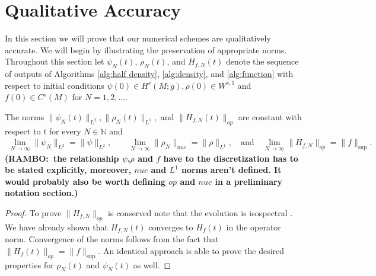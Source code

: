 \documentclass[final,leqno]{siamltex1213}
\newcommand{\ram}[1]{{\normalsize{\textbf{({\color{red}RAMBO:\ }#1)}}}}
\begin{document}
\section{Qualitative Accuracy} \label{sec:qualitative}
In this section we will prove that our numerical schemes are qualitatively accurate.
We will begin by illustrating the preservation of appropriate norms.
Throughout this section let $\psi_{N}(t)$, $\rho_{N}(t)$, and $H_{f,N}(t)$ denote the sequence of
outputs of Algorithms \ref{alg:half density}, \ref{alg:density}, and \ref{alg:function}
with respect to initial conditions $\psi(0) \in H^{s}(M;g), \rho(0) \in W^{s,1}$ and $f(0) \in C^{s}(M)$ for $N = 1,2,\dots$.
	
\begin{theorem} \label{thm:norms}
	The norms $\| \psi_{N} (t)\|_{L^{2}}, \|\rho_{N}(t)\|_{L^{1}},$ and $\| H_{f,N}(t) \|_{op}$ are constant with respect to $t$ for every $N \in \mathbb{N}$ and
	\begin{align}
		\lim_{N \to \infty} \| \psi_{N} \|_{L^{2}} = \| \psi \|_{L^{2}}, \quad \quad
		\lim_{N \to \infty} \| \rho_{N} \|_{nuc} = \| \rho \|_{L^{1}}, \quad \textrm{and} \quad
		\lim_{N \to \infty} \| H_{f,N} \|_{op} = \| f \|_{\sup}.
	\end{align}
	\ram{the relationship $\psi$,$\rho$ and $f$ have to the discretization has to be stated explicitly, moreover, $nuc$ and $L^1$ norms aren't defined. It would probably also be worth defining $op$ and $nuc$ in a preliminary notation section.}
\end{theorem}
\begin{proof}
	To prove $\| H_{f,N} \|_{op}$ is conserved note that the evolution is isospectral \cite{Calvo1997}.
	We have already shown that $H_{f,N}(t)$ converges to $H_{f}(t)$ in the operator norm.
	Convergence of the norms follows from the fact that $\| H_{f}(t) \|_{op} = \| f \|_{\sup}$.
	An identical approach is able to prove the desired properties for $\rho_{N}(t)$ and $\psi_{N}(t)$ as well.
\end{proof}
\end{document}
